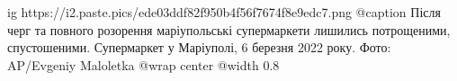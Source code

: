  
 
 
 
 

\ifcmt
	ig https://i2.paste.pics/ede03ddf82f950b4f56f7674f8e9edc7.png
	@caption Після черг та повного розорення маріупольські супермаркети лишились потрощеними, спустошеними. Супермаркет у Маріуполі, 6 березня 2022 року. Фото: AP/Evgeniy Maloletka
  @wrap center
  @width 0.8
\fi


